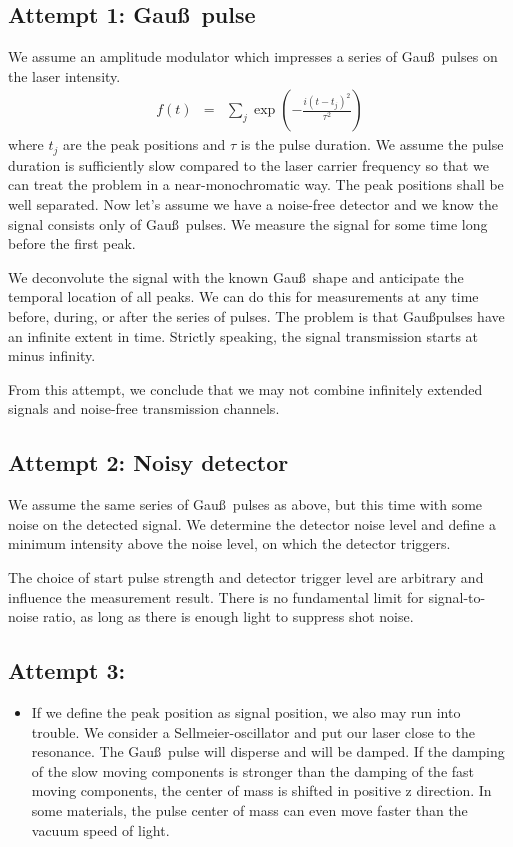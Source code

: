 \documentclass[12pt,a4paper,twoside,openright,BCOR10mm,headsepline,titlepage,abstracton,chapterprefix,final]{scrreprt}
\begin{document}
\subsection{Attempt 1: Gau\ss\, pulse}
We assume an amplitude modulator which impresses a series of Gau\ss\, pulses on the laser intensity.
\begin{eqnarray}
  f(t) &=& \sum_j \exp\left(- \frac{i(t-t_j)^2}{\tau^2}\right) 
\end{eqnarray}
where $t_j$ are the peak positions and $\tau$ is the pulse duration.
We assume the pulse duration is sufficiently slow compared to the laser carrier frequency 
so that we can treat the problem in a near-monochromatic way.
The peak positions shall be well separated.
Now let's assume we have a noise-free detector and we know the signal consists only of Gau\ss\, pulses.
We measure the signal for some time long before the first peak.

We deconvolute the signal with the known Gau\ss\, shape and anticipate the temporal location of all peaks.
We can do this for measurements at any time before, during, or after the series of pulses.
The problem is that Gau\ss pulses have an infinite extent in time.
Strictly speaking, the signal transmission starts at minus infinity.

From this attempt, we conclude that we may not combine infinitely extended signals and noise-free transmission channels.

\subsection{Attempt 2: Noisy detector}
We assume the same series of Gau\ss\, pulses as above, but this time with some noise on the detected signal.
We determine the detector noise level and define a minimum intensity above the noise level, on which the detector triggers.

The choice of start pulse strength and detector trigger level are arbitrary and influence the measurement result.
There is no fundamental limit for signal-to-noise ratio, as long as there is enough light to suppress shot noise.

\subsection{Attempt 3:}

\begin{itemize}
 \item If we define the peak position as signal position, we also may run into trouble.
       We consider a Sellmeier-oscillator and put our laser close to the resonance.
       The Gau\ss\, pulse will disperse and will be damped.
       If the damping of the slow moving components is stronger than the damping of the fast moving components,
       the center of mass is shifted in positive z direction.
       In some materials, the pulse center of mass can even move faster than the vacuum speed of light.
\end{itemize}
\end{document}
